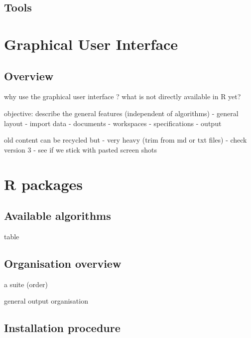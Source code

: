 \documentclass[
  letterpaper,
  DIV=11,
  numbers=noendperiod]{scrreprt}
\begin{document}
\hypertarget{tools-4}{%
\section{Tools}\label{tools-4}}

\hypertarget{graphical-user-interface}{%
\chapter{Graphical User Interface}\label{graphical-user-interface}}

\hypertarget{overview}{%
\section{Overview}\label{overview}}

why use the graphical user interface ? what is not directly available in
R yet?

objective: describe the general features (independent of algorithms) -
general layout - import data - documents - workspaces - specifications -
output

old content can be recycled but - very heavy (trim from md or txt files)
- check version 3 - see if we stick with pasted screen shots

\hypertarget{r-packages}{%
\chapter{R packages}\label{r-packages}}

\hypertarget{available-algorithms}{%
\section{Available algorithms}\label{available-algorithms}}

table

\hypertarget{organisation-overview}{%
\section{Organisation overview}\label{organisation-overview}}

a suite (order)

general output organisation

\hypertarget{installation-procedure}{%
\section{Installation procedure}\label{installation-procedure}}
\end{document}
